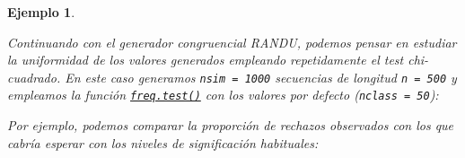 \documentclass[
  10pt,
]{book}
\newenvironment{Shaded}{\begin{snugshade}}{\end{snugshade}}
\newcommand{\AttributeTok}[1]{\textcolor[rgb]{0.77,0.63,0.00}{#1}}
\newcommand{\CommentTok}[1]{\textcolor[rgb]{0.56,0.35,0.01}{\textit{#1}}}
\newcommand{\ControlFlowTok}[1]{\textcolor[rgb]{0.13,0.29,0.53}{\textbf{#1}}}
\newcommand{\DecValTok}[1]{\textcolor[rgb]{0.00,0.00,0.81}{#1}}
\newcommand{\FunctionTok}[1]{\textcolor[rgb]{0.00,0.00,0.00}{#1}}
\newcommand{\NormalTok}[1]{#1}
\newcommand{\OtherTok}[1]{\textcolor[rgb]{0.56,0.35,0.01}{#1}}
\newcommand{\SpecialCharTok}[1]{\textcolor[rgb]{0.00,0.00,0.00}{#1}}
\newcommand{\StringTok}[1]{\textcolor[rgb]{0.31,0.60,0.02}{#1}}
\theoremstyle{break}
\newtheorem{example}{Ejemplo}[chapter]
\theoremstyle{nonumberplain}
\renewcommand{\CommentTok}[1]{\textcolor[rgb]{0.41,0.41,0.41}{\texttt{#1}}}
\begin{document}
\begin{example}
\protect\hypertarget{exm:rep-test-randu}{}\label{exm:rep-test-randu}

Continuando con el generador congruencial RANDU, podemos pensar en estudiar la uniformidad de los valores generados empleando repetidamente el test chi-cuadrado.
En este caso generamos \texttt{nsim\ =\ 1000} secuencias de longitud \texttt{n\ =\ 500} y empleamos la función \href{https://rubenfcasal.github.io/simres/reference/freq.test.html}{\texttt{freq.test()}} con los valores por defecto (\texttt{nclass\ =\ 50}):

\begin{Shaded}
\end{Shaded}

Por ejemplo, podemos comparar la proporción de rechazos observados con los que cabría esperar con los niveles de significación habituales:


\end{example}
\end{document}
